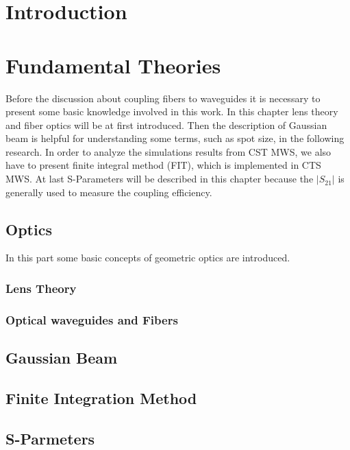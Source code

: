 
\chapter{Introduction}



\chapter{Fundamental Theories}
\label{chp:background}
Before the discussion about coupling fibers to waveguides it is necessary to present some basic knowledge involved in this work.  In this chapter lens theory and fiber optics will be at first introduced. Then the description of Gaussian beam is helpful for understanding some terms, such as spot size, in the following research.  
In order to analyze the simulations results from CST MWS, we also have to present finite integral method (FIT), which is implemented in CTS MWS. At last S-Parameters will be described in this chapter because the $|S_{21}|$ is generally used to measure the coupling efficiency.
 
\section{Optics}
\label{sect:background_optics}
In this part some basic concepts of geometric optics are introduced.
\subsection{Lens Theory}

\subsection{Optical waveguides and Fibers}


\section{Gaussian Beam}
\label{sect:gaussian_beam}


\section{Finite Integration Method}



\section{S-Parmeters}


